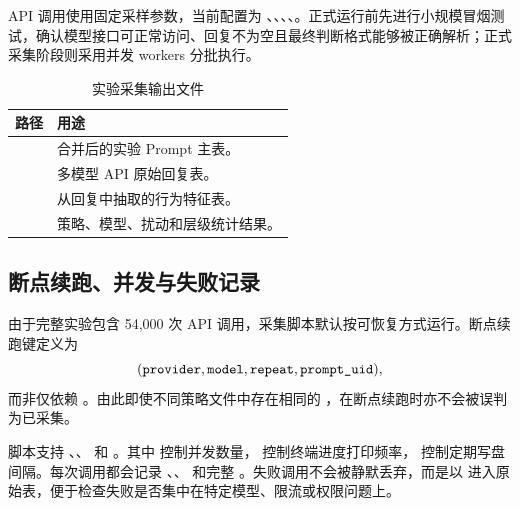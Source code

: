 API 调用使用固定采样参数，当前配置为 、、、、。正式运行前先进行小规模冒烟测试，确认模型接口可正常访问、回复不为空且最终判断格式能够被正确解析；正式采集阶段则采用并发 workers 分批执行。



\begin{table}[t]
\centering
\caption{实验采集输出文件}
\label{tab:outputs}
\small
\begin{tabularx}{\columnwidth}{p{}Y}
\toprule
路径 & 用途 \\
\midrule
{} & 合并后的实验 Prompt 主表。\\
 & 多模型 API 原始回复表。\\
 & 从回复中抽取的行为特征表。\\
 & 策略、模型、扰动和层级统计结果。\\
\bottomrule
\end{tabularx}
\end{table}

\subsection{断点续跑、并发与失败记录}

由于完整实验包含 54{,}000 次 API 调用，采集脚本默认按可恢复方式运行。断点续跑键定义为
\begin{equation}
(\mcode{provider},\mcode{model},\mcode{repeat},\mcode{prompt_uid}),
\end{equation}
而非仅依赖 。由此即使不同策略文件中存在相同的 ，在断点续跑时亦不会被误判为已采集。

脚本支持 、、 和 。其中  控制并发数量， 控制终端进度打印频率， 控制定期写盘间隔。每次调用都会记录 、、 和完整 。失败调用不会被静默丢弃，而是以  进入原始表，便于检查失败是否集中在特定模型、限流或权限问题上。

